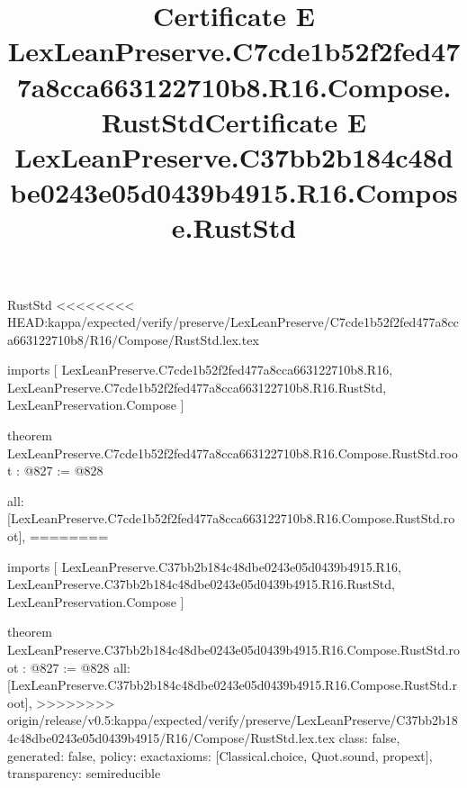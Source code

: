 \begin{lexlean}{RustStd}
<<<<<<<< HEAD:kappa/expected/verify/preserve/LexLeanPreserve/C7cde1b52f2fed477a8cca663122710b8/R16/Compose/RustStd.lex.tex
\title{Certificate E LexLeanPreserve.C7cde1b52f2fed477a8cca663122710b8.R16.Compose.RustStd}
\begin{coremodule}
imports [
  LexLeanPreserve.C7cde1b52f2fed477a8cca663122710b8.R16,
  LexLeanPreserve.C7cde1b52f2fed477a8cca663122710b8.R16.RustStd,
  LexLeanPreservation.Compose
]

theorem LexLeanPreserve.C7cde1b52f2fed477a8cca663122710b8.R16.Compose.RustStd.root : @827 := @828 {
  all: [LexLeanPreserve.C7cde1b52f2fed477a8cca663122710b8.R16.Compose.RustStd.root],
========
\title{Certificate E LexLeanPreserve.C37bb2b184c48dbe0243e05d0439b4915.R16.Compose.RustStd}
\begin{coremodule}
imports [
  LexLeanPreserve.C37bb2b184c48dbe0243e05d0439b4915.R16,
  LexLeanPreserve.C37bb2b184c48dbe0243e05d0439b4915.R16.RustStd,
  LexLeanPreservation.Compose
]

theorem LexLeanPreserve.C37bb2b184c48dbe0243e05d0439b4915.R16.Compose.RustStd.root : @827 := @828 {
  all: [LexLeanPreserve.C37bb2b184c48dbe0243e05d0439b4915.R16.Compose.RustStd.root],
>>>>>>>> origin/release/v0.5:kappa/expected/verify/preserve/LexLeanPreserve/C37bb2b184c48dbe0243e05d0439b4915/R16/Compose/RustStd.lex.tex
  class: false,
  generated: false,
  policy: exact{axioms: [Classical.choice, Quot.sound, propext]},
  transparency: semireducible
}


\end{coremodule}}
\end{coremodule}
\end{lexlean}
